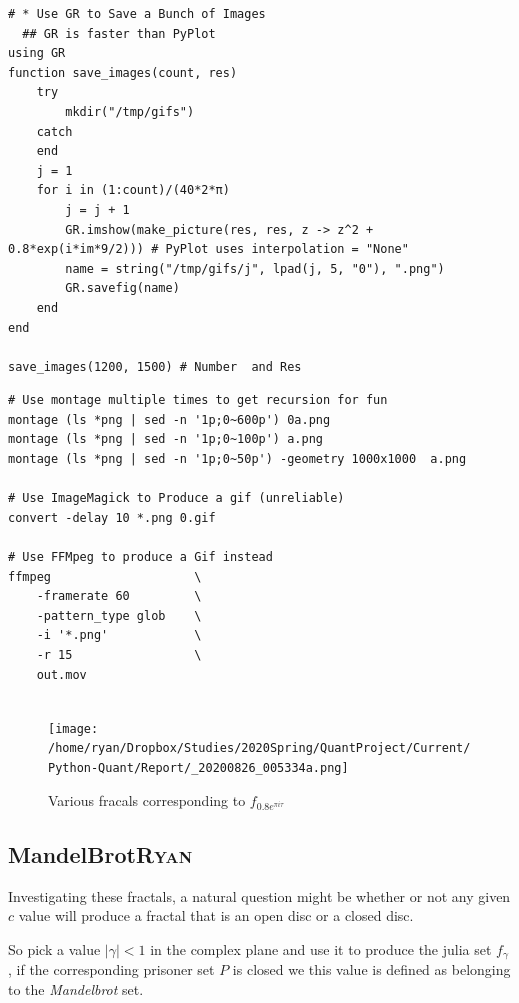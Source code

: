 \documentclass[11pt]{article}
\begin{document}
\begin{lstlisting}
# * Use GR to Save a Bunch of Images
  ## GR is faster than PyPlot
using GR
function save_images(count, res)
    try
        mkdir("/tmp/gifs")
    catch
    end
    j = 1
    for i in (1:count)/(40*2*π)
        j = j + 1
        GR.imshow(make_picture(res, res, z -> z^2 + 0.8*exp(i*im*9/2))) # PyPlot uses interpolation = "None"
        name = string("/tmp/gifs/j", lpad(j, 5, "0"), ".png")
        GR.savefig(name)
    end
end

save_images(1200, 1500) # Number  and Res
\end{lstlisting}

\begin{lstlisting}
# Use montage multiple times to get recursion for fun
montage (ls *png | sed -n '1p;0~600p') 0a.png
montage (ls *png | sed -n '1p;0~100p') a.png
montage (ls *png | sed -n '1p;0~50p') -geometry 1000x1000  a.png

# Use ImageMagick to Produce a gif (unreliable)
convert -delay 10 *.png 0.gif

# Use FFMpeg to produce a Gif instead
ffmpeg                    \
    -framerate 60         \
    -pattern_type glob    \
    -i '*.png'            \
    -r 15                 \
    out.mov


\end{lstlisting}

\begin{figure}[htbp]
\centering
\texttt{[image: /home/ryan/Dropbox/Studies/2020Spring/QuantProject/Current/Python-Quant/Report/\_20200826\_005334a.png]}
\caption{\label{montage-frac}Various fracals corresponding to \(f_{0.8 e^{\pi i \tau}}\)}
\end{figure}

\subsection{MandelBrot\hfill{}\textsc{Ryan}}
\label{sec:orgbbd919e}
Investigating these fractals, a natural question might be whether or not any
given \(c\) value will produce a fractal that is an open disc or a closed disc.

So pick a value \(\left\lvert \gamma \right \rvert < 1\) in the complex plane and
use it to produce the julia set \(f_{\gamma}\), if the corresponding prisoner set
\(P\) is closed we this value is defined as belonging to the \emph{Mandelbrot} set.
\end{document}
